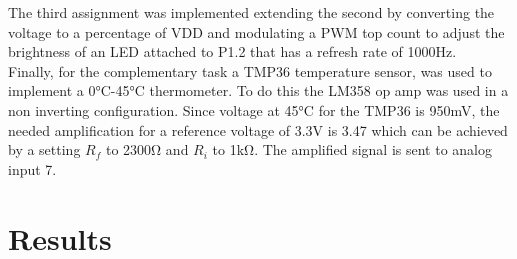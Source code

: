 \documentclass[journal]{IEEEtran}
\begin{document}
The third assignment was implemented extending the second by converting the voltage to a percentage of VDD and modulating a PWM top count to adjust the brightness of an LED attached to P1.2 that has a refresh rate of 1000\si{\hertz}.\\
Finally, for the complementary task a TMP36 temperature sensor, was used to implement a 0\si{\celsius}-45\si{\celsius} thermometer. To do this the LM358 op amp was used in a non inverting configuration. Since voltage at 45\si{\celsius} for the TMP36 is 950\si{\milli\V}, the needed amplification for a reference voltage of 3.3\si{\V} is 3.47 which can be achieved by a setting $R_{f}$ to 2300\si{\ohm} and $R_{i}$ to 1\si{\kilo\ohm}.  The amplified signal is sent to analog input 7.
\section{Results}
\nocite{rojasEmbeddedSystemsDesign2016}
\nocite{LCDControllerDatasheets}


\end{document}
